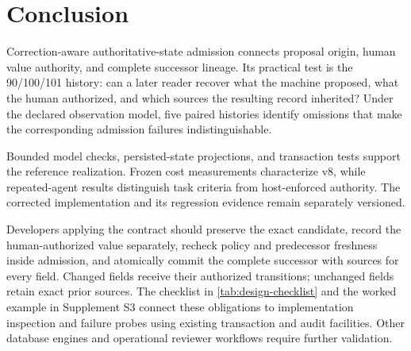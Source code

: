 \section{Conclusion}
\label{sec:conclusion}

Correction-aware authoritative-state admission connects proposal origin, human value authority, and complete successor lineage. Its practical test is the 90/100/101 history: can a later reader recover what the machine proposed, what the human authorized, and which sources the resulting record inherited? Under the declared observation model, five paired histories identify omissions that make the corresponding admission failures indistinguishable.

Bounded model checks, persisted-state projections, and transaction tests support the reference realization. Frozen cost measurements characterize v8, while repeated-agent results distinguish task criteria from host-enforced authority. The corrected implementation and its regression evidence remain separately versioned.

Developers applying the contract should preserve the exact candidate, record the human-authorized value separately, recheck policy and predecessor freshness inside admission, and atomically commit the complete successor with sources for every field. Changed fields receive their authorized transitions; unchanged fields retain exact prior sources. The checklist in \cref{tab:design-checklist} and the worked example in Supplement S3 connect these obligations to implementation inspection and failure probes using existing transaction and audit facilities. Other database engines and operational reviewer workflows require further validation.
